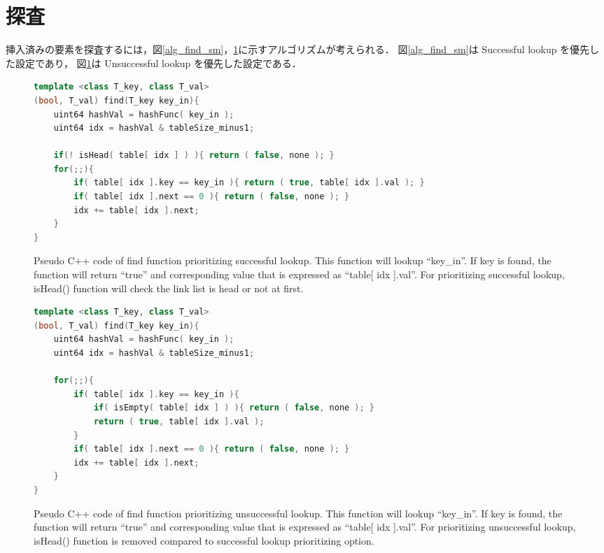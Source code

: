 \section{探査}
挿入済みの要素を探査するには，図\ref{alg_find_sm}，\ref{alg_find_usm}に示すアルゴリズムが考えられる．
図\ref{alg_find_sm}は Successful lookup を優先した設定であり，
図\ref{alg_find_usm}は Unsuccessful lookup を優先した設定である．

\begin{figure}[h] %
\begin{lstlisting}[language=C++]
template <class T_key, class T_val>
(bool, T_val) find(T_key key_in){
	uint64 hashVal = hashFunc( key_in );
	uint64 idx = hashVal & tableSize_minus1;
	
	if(! isHead( table[ idx ] ) ){ return ( false, none ); }
	for(;;){
		if( table[ idx ].key == key_in ){ return ( true, table[ idx ].val ); }
		if( table[ idx ].next == 0 ){ return ( false, none ); }
		idx += table[ idx ].next;
	}
}
\end{lstlisting}
\caption{
  Pseudo C++ code of find function prioritizing successful lookup.
  This function will lookup ``key\_in''.
  If key is found, the function will return ``true'' and corresponding value that is expressed as ``table[ idx ].val''.
  For prioritizing successful lookup, isHead() function will check the link list is head or not at first.
}
\label{alg_find_sm}
\begin{lstlisting}[language=C++]
template <class T_key, class T_val>
(bool, T_val) find(T_key key_in){
	uint64 hashVal = hashFunc( key_in );
	uint64 idx = hashVal & tableSize_minus1;
	
	for(;;){
		if( table[ idx ].key == key_in ){
			if( isEmpty( table[ idx ] ) ){ return ( false, none ); }
			return ( true, table[ idx ].val );
		}
		if( table[ idx ].next == 0 ){ return ( false, none ); }
		idx += table[ idx ].next;
	}
}
\end{lstlisting}
\caption{
  Pseudo C++ code of find function prioritizing unsuccessful lookup.
  This function will lookup ``key\_in''.
  If key is found, the function will return ``true'' and corresponding value that is expressed as ``table[ idx ].val''.
  For prioritizing unsuccessful lookup, isHead() function is removed compared to successful lookup prioritizing option.
}
\label{alg_find_usm}
\end{figure}


